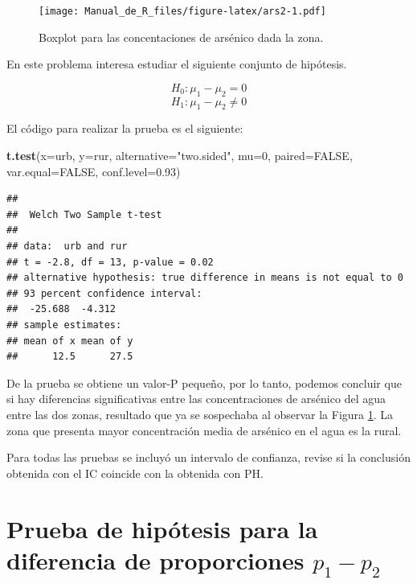 \documentclass[10pt,]{krantz}
\makeatletter
\newenvironment{Shaded}{\begin{snugshade}}{\end{snugshade}}
\newcommand{\KeywordTok}[1]{\textcolor[rgb]{0.13,0.29,0.53}{\textbf{{#1}}}}
\newcommand{\DataTypeTok}[1]{\textcolor[rgb]{0.13,0.29,0.53}{{#1}}}
\newcommand{\DecValTok}[1]{\textcolor[rgb]{0.00,0.00,0.81}{{#1}}}
\newcommand{\FloatTok}[1]{\textcolor[rgb]{0.00,0.00,0.81}{{#1}}}
\newcommand{\StringTok}[1]{\textcolor[rgb]{0.31,0.60,0.02}{{#1}}}
\newcommand{\OtherTok}[1]{\textcolor[rgb]{0.56,0.35,0.01}{{#1}}}
\newcommand{\NormalTok}[1]{{#1}}
\newenvironment{kframe}{%
\medskip{}
\setlength{\fboxsep}{.8em}
 \def\at@end@of@kframe{}%
 \ifinner\ifhmode%
  \def\at@end@of@kframe{\end{minipage}}%
  \begin{minipage}{\columnwidth}%
 \fi\fi%
 \def\FrameCommand##1{\hskip\@totalleftmargin \hskip-\fboxsep
 \colorbox{shadecolor}{##1}\hskip-\fboxsep
     \hskip-\linewidth \hskip-\@totalleftmargin \hskip\columnwidth}%
 \MakeFramed {\advance\hsize-\width
   \@totalleftmargin\z@ \linewidth\hsize
   \@setminipage}}%
 {\par\unskip\endMakeFramed%
 \at@end@of@kframe}
\renewenvironment{Shaded}{\begin{kframe}}{\end{kframe}}
\let\BeginKnitrBlock\begin \let\EndKnitrBlock\end
\makeatother
\begin{document}
\begin{figure}[htbp]
\centering
\texttt{[image: Manual\_de\_R\_files/figure-latex/ars2-1.pdf]}
\caption{\label{fig:ars2}Boxplot para las concentaciones de arsénico dada la
zona.}
\end{figure}

En este problema interesa estudiar el siguiente conjunto de hipótesis.

\[H_0: \mu_1  - \mu_2 = 0\] \[H_1: \mu_1  - \mu_2 \neq 0\]

El código para realizar la prueba es el siguiente:

\begin{Shaded}
\begin{Highlighting}[]
\KeywordTok{t.test}\NormalTok{(}\DataTypeTok{x=}\NormalTok{urb, }\DataTypeTok{y=}\NormalTok{rur, }\DataTypeTok{alternative=}\StringTok{"two.sided"}\NormalTok{, }\DataTypeTok{mu=}\DecValTok{0}\NormalTok{, }
       \DataTypeTok{paired=}\OtherTok{FALSE}\NormalTok{, }\DataTypeTok{var.equal=}\OtherTok{FALSE}\NormalTok{, }\DataTypeTok{conf.level=}\FloatTok{0.93}\NormalTok{)}
\end{Highlighting}
\end{Shaded}

\begin{verbatim}
## 
##  Welch Two Sample t-test
## 
## data:  urb and rur
## t = -2.8, df = 13, p-value = 0.02
## alternative hypothesis: true difference in means is not equal to 0
## 93 percent confidence interval:
##  -25.688  -4.312
## sample estimates:
## mean of x mean of y 
##      12.5      27.5
\end{verbatim}

De la prueba se obtiene un valor-P pequeño, por lo tanto, podemos
concluir que si hay diferencias significativas entre las concentraciones
de arsénico del agua entre las dos zonas, resultado que ya se sospechaba
al observar la Figura \ref{fig:ars2}. La zona que presenta mayor
concentración media de arsénico en el agua es la rural.

\BeginKnitrBlock{rmdtip}
Para todas las pruebas se incluyó un intervalo de confianza, revise si
la conclusión obtenida con el IC coincide con la obtenida con PH.
\EndKnitrBlock{rmdtip}

\section{\texorpdfstring{Prueba de hipótesis para la diferencia de
proporciones
\(p_1 - p_2\)}{Prueba de hipótesis para la diferencia de proporciones p\_1 - p\_2}}\label{prueba-de-hipotesis-para-la-diferencia-de-proporciones-p_1---p_2}
\end{document}
